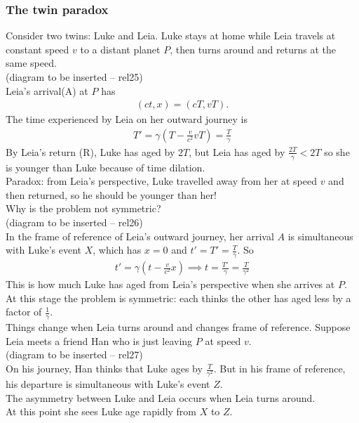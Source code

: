 \documentclass[a4paper]{article}
\begin{document}
\subsubsection{The twin paradox}
Consider two twins: Luke and Leia. Luke stays at home while Leia travels at constant speed $v$ to a distant planet $P$, then turns around and returns at the same speed.\\
(diagram to be inserted -- rel25)\\
Leia's arrival(A) at $P$ has
\begin{equation*}
\begin{aligned}
\left(ct,x\right) = \left(cT,vT\right).
\end{aligned}
\end{equation*}
The time experienced by Leia on her outward journey is
\begin{equation*}
\begin{aligned}
T' = \gamma \left(T-\frac{v}{c^2}vT\right) = \frac{T}{\gamma}
\end{aligned}
\end{equation*}
By Leia's return (R), Luke has aged by $2T$, but Leia has aged by $\frac{2T}{\gamma}<2T$ so she is younger than Luke because of time dilation.\\
Paradox: from Leia's perspective, Luke travelled away from her at speed $v$ and then returned, so he should be younger than her!\\
Why is the problem not symmetric?\\
(diagram to be inserted -- rel26)\\
In the frame of reference of Leia's outward journey, her arrival $A$ is simultaneous with Luke's event $X$, which has $x=0$ and $t'=T'=\frac{T}{\gamma}$. So
\begin{equation*}
\begin{aligned}
t' = \gamma\left(t-\frac{v}{c^2}x\right) \implies t=\frac{T'}{\gamma}=\frac{T}{\gamma^2}
\end{aligned}
\end{equation*}
This is how much Luke has aged from Leia's perspective when she arrives at $P$.\\
At this stage the problem is symmetric: each thinks the other has aged less by a factor of $\frac{1}{\gamma}$.\\
Things change when Leia turns around and changes frame of reference. Suppose Leia meets a friend Han who is just leaving $P$ at speed $v$.\\
(diagram to be inserted -- rel27)\\
On his journey, Han thinks that Luke ages by $\frac{T}{\gamma^2}$. But in his frame of reference, his departure is simultaneous with Luke's event $Z$.\\
The asymmetry between Luke and Leia occurs when Leia turns around.\\
At this point she sees Luke age rapidly from $X$ to $Z$.
\end{document}
